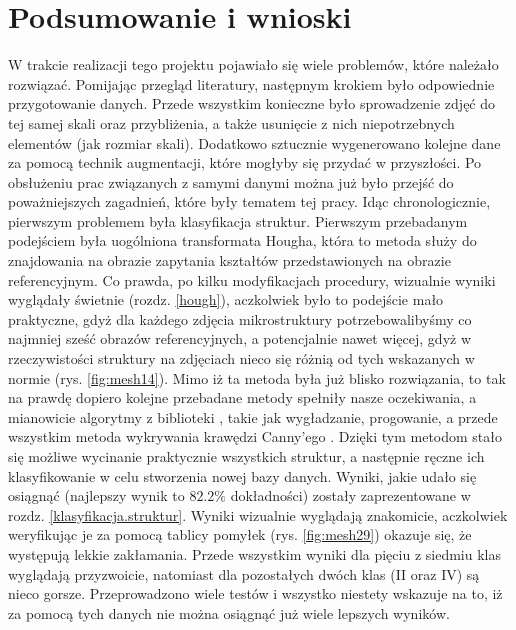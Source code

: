 \chapter{Podsumowanie i wnioski}
\label{podsumowanie.wnioski}

W trakcie realizacji tego projektu pojawiało się wiele problemów, które należało rozwiązać. Pomijając przegląd literatury, następnym krokiem było odpowiednie przygotowanie danych. Przede wszystkim konieczne było sprowadzenie zdjęć do tej samej skali oraz przybliżenia, a także usunięcie z nich niepotrzebnych elementów (jak rozmiar skali). Dodatkowo sztucznie wygenerowano kolejne dane za pomocą technik augmentacji, które mogłyby się przydać w przyszłości. Po obsłużeniu prac związanych z samymi danymi można już było przejść do poważniejszych zagadnień, które były tematem tej pracy. Idąc chronologicznie, pierwszym problemem była klasyfikacja struktur. Pierwszym przebadanym podejściem była uogólniona transformata Hougha, która to metoda służy do znajdowania na obrazie zapytania kształtów przedstawionych na obrazie referencyjnym. Co prawda, po kilku modyfikacjach procedury, wizualnie wyniki wyglądały świetnie (rozdz. \ref{hough}), aczkolwiek było to podejście mało praktyczne, gdyż dla każdego zdjęcia mikrostruktury potrzebowalibyśmy co najmniej sześć obrazów referencyjnych, a potencjalnie nawet więcej, gdyż w rzeczywistości struktury na zdjęciach nieco się różnią od tych wskazanych w normie (rys. \ref{fig:mesh14}). 
Mimo iż ta metoda była już blisko rozwiązania, to tak na prawdę dopiero kolejne przebadane metody spełniły nasze oczekiwania, a mianowicie algorytmy z biblioteki \href{https://opencv.org/}{}, takie jak wygładzanie, progowanie, a przede wszystkim metoda wykrywania krawędzi Canny'ego \cite{Canny86}. Dzięki tym metodom stało się możliwe wycinanie praktycznie wszystkich struktur, a następnie ręczne ich klasyfikowanie w celu stworzenia nowej bazy danych. Wyniki, jakie udało się osiągnąć (najlepszy wynik to $82.2\%$ dokładności) zostały zaprezentowane w rozdz. \ref{klasyfikacja.struktur}. Wyniki wizualnie wyglądają znakomicie, aczkolwiek weryfikując je za pomocą tablicy pomyłek (rys. \ref{fig:mesh29}) okazuje się, że występują lekkie zakłamania. Przede wszystkim wyniki dla pięciu z siedmiu klas wyglądają przyzwoicie, natomiast dla pozostałych dwóch klas (II oraz IV) są nieco gorsze. Przeprowadzono wiele testów i wszystko niestety wskazuje na to, iż za pomocą tych danych nie można osiągnąć już wiele lepszych wyników.

